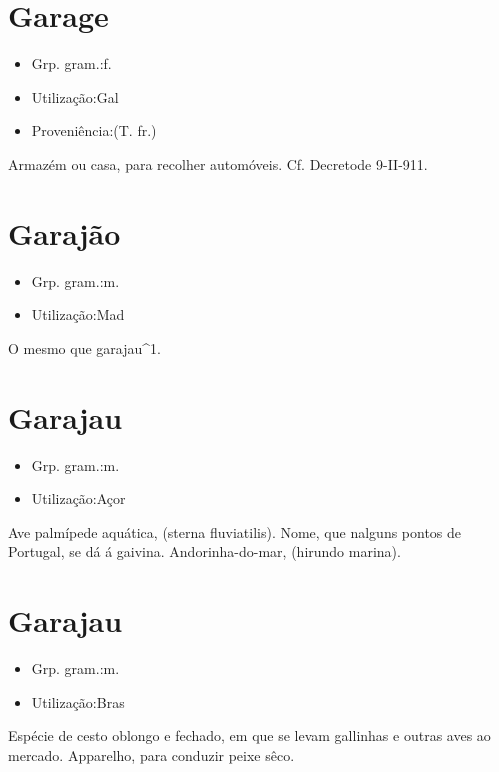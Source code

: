 \section{Garage}
\begin{itemize}
\item {Grp. gram.:f.}
\end{itemize}
\begin{itemize}
\item {Utilização:Gal}
\end{itemize}
\begin{itemize}
\item {Proveniência:(T. fr.)}
\end{itemize}
Armazém ou casa, para recolher automóveis. Cf. \textunderscore Decreto\textunderscore  de 9-II-911.
\section{Garajão}
\begin{itemize}
\item {Grp. gram.:m.}
\end{itemize}
\begin{itemize}
\item {Utilização:Mad}
\end{itemize}
O mesmo que \textunderscore garajau\textunderscore ^1.
\section{Garajau}
\begin{itemize}
\item {Grp. gram.:m.}
\end{itemize}
\begin{itemize}
\item {Utilização:Açor}
\end{itemize}
Ave palmípede aquática, (\textunderscore sterna fluviatilis\textunderscore ).
Nome, que nalguns pontos de Portugal, se dá á gaivina.
Andorinha-do-mar, (\textunderscore hirundo marina\textunderscore ).
\section{Garajau}
\begin{itemize}
\item {Grp. gram.:m.}
\end{itemize}
\begin{itemize}
\item {Utilização:Bras}
\end{itemize}
Espécie de cesto oblongo e fechado, em que se levam gallinhas e outras aves ao mercado.
Apparelho, para conduzir peixe sêco.

